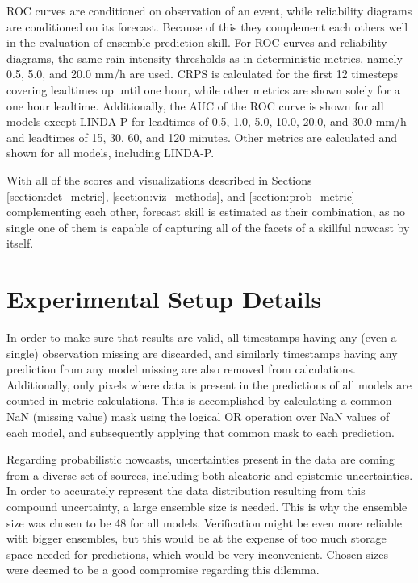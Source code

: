 ROC curves are conditioned on observation of an event, while reliability diagrams are conditioned on its forecast. Because of this they complement each others well in the evaluation of ensemble prediction skill. For ROC curves and reliability diagrams, the same rain intensity thresholds as in deterministic metrics, namely 0.5, 5.0, and 20.0 mm/h are used. CRPS is calculated for the first 12 timesteps covering leadtimes up until one hour, while other metrics are shown solely for a one hour leadtime. Additionally, the AUC of the ROC curve is shown for all models except LINDA-P for leadtimes of 0.5, 1.0, 5.0, 10.0, 20.0, and 30.0 mm/h and leadtimes of 15, 30, 60, and 120 minutes. Other metrics are calculated and shown for all models, including LINDA-P.

 With all of the scores and visualizations described in Sections \ref{section:det_metric}, \ref{section:viz_methods}, and \ref{section:prob_metric} complementing each other, forecast skill is estimated as their combination, as no single one of them is capable of capturing all of the facets of a skillful nowcast by itself. 
 
\section{Experimental Setup Details}
\label{section:exp}

In order to make sure that results are valid, all timestamps having any (even a single) observation missing are discarded, and similarly timestamps having any prediction from any model missing are also removed from calculations. Additionally, only pixels where data is present in the predictions of all models are counted in metric calculations. This is accomplished by calculating a common NaN (missing value) mask using the logical OR operation over NaN values of each model, and subsequently applying that common mask to each prediction.

Regarding probabilistic nowcasts, uncertainties present in the data are coming from a diverse set of sources, including both aleatoric and epistemic uncertainties. In order to accurately represent the data distribution resulting from this compound uncertainty, a large ensemble size is needed. This is why the ensemble size was chosen to be 48 for all models. Verification might be even more reliable with bigger ensembles, but this would be at the expense of too much storage space needed for predictions, which would be very inconvenient. Chosen sizes were deemed to be a good compromise regarding this dilemma.

